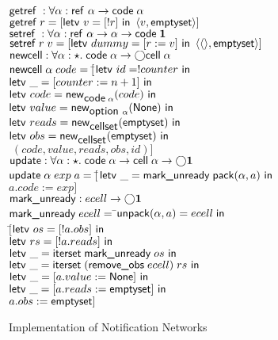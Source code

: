 \documentclass[preprint,natbib]{sigplanconf}
\begin{document}
\begin{figure}
\begin{tabbing}
$\getref : \forall \alpha : \reftype{\alpha} \to \codetype{\alpha}$ \\
$\getref r = \comp{\letv{v}{\comp{!r}}{\pair{v}{\ctext{emptyset}}}}$ \\[1em]

$\setref : \forall \alpha : \reftype{\alpha} \to \alpha \to \codetype{\unittype}$ \\
$\setref r\;v = \comp{\letv{dummy}{\comp{r := v}}{\pair{\unit}{\ctext{emptyset}}}}$ \\[1em]

$\ctext{newcell} : \forall \alpha:\star.\; \codetype{\alpha} \to \monad{\celltype{\alpha}}$ \\
$\ctext{newcell}\;\alpha\;code = [$\=$\letv{id}{!counter}{}$ \\
                                   \>$\letv{\_}{\comp{counter := n + 1}}{}$ \\
                                   \>$\letv{code}{\newref{\codetype{\alpha}}{code}}{}$ \\
                                   \>$\letv{value}{\newref{\opttype{\alpha}}{\ctext{None}}}{}$ \\
                                   \>$\letv{reads}{\newref{\cellset}{\ctext{emptyset}}}{}$ \\
                                   \>$\letv{obs}{\newref{\cellset}{\ctext{emptyset}}}{}$ \\
                                   \>$\; (code, value, reads, obs, id)]$ \\[1em]

$\ctext{update} : \forall \alpha:\star.\; \codetype{\alpha} \to \celltype{\alpha} \to \monad{\unittype}$\\
$\ctext{update}\;\alpha\;exp\;a = 
     [$\=$\letv{\_}{\ctext{mark\_unready}\;\pack{\alpha}{a}}{}$ \\
       \>$a.code := exp]$ \\[1em]

$\ctext{mark\_unready} : ecell \to \monad{\unittype}$ \\
$\ctext{mark\_unready}\;ecell =\; $\=$\ctext{unpack}(\alpha, a) = ecell\; \ctext{in}$\\
\>  $[$\=$\letv{os}{\comp{!a.obs}}{}$ \\
\>     \>$\letv{rs}{\comp{!a.reads}}{}$ \\
\>     \>$\letv{\_}{\ctext{iterset}\;\ctext{mark\_unready}\;os}{}$ \\
\>     \>$\letv{\_}{\ctext{iterset}\;(\ctext{remove\_obs}\;ecell)\;rs}{}$ \\
\>     \>$\letv{\_}{\comp{a.value := \ctext{None}}}{}$ \\
\>     \>$\letv{\_}{\comp{a.reads := \ctext{emptyset}}}{}$ \\
\>     \>$a.obs   := \ctext{emptyset}]$ 
\end{tabbing}
\caption{Implementation of Notification Networks}
\label{notification-implementation}
\end{figure}
\end{document}

